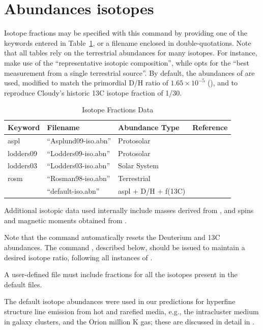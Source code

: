 \section{Abundances isotopes}

Isotope fractions may be specified with this command by providing
one of the keywords entered in Table~\ref{tab:isotopes}, or a
filename enclosed in double-quotations.
Note that all tables rely on the \citet{Rosman1998}
terrestrial abundances for many isotopes.
For instance, \citet{Asplund2009} make use of the
``representative isotopic composition'', while \citet{Lodders2003}
opts for the ``best measurement from a single terrestrial source''.
By default, the abundances of \citet{Asplund2009} are used,
modified to match the primordial D/H ratio of $1.65 \times 10^{-5}$
(\citealp{Pettini2001}), and to reproduce Cloudy's historic 13C isotope
fraction of 1/30.

\begin{table}
\centering
\caption{Isotope Fractions Data}
\label{tab:isotopes}
\begin{tabular}{llll}
\hline
Keyword		& Filename		& Abundance Type	&	Reference		\\
\hline
aspl		& ``Asplund09-iso.abn''	& Protosolar		&	\citet{Asplund2009}	\\
lodders09	& ``Lodders09-iso.abn''	& Protosolar		&	\citet{Lodders2009}	\\
lodders03	& ``Lodders03-iso.abn''	& Solar System		&	\citet{Lodders2003}	\\
rosm		& ``Rosman98-iso.abn''	& Terrestrial 		&	\citet{Rosman1998}	\\
    		& ``default-iso.abn''	& aspl + D/H + f(13C)	&				\\
\hline
\end{tabular}
\end{table}

Additional isotopic data used internally include masses
derived from \citet{Audi1995}, and spins and magnetic
moments obtained from \citet{Stone2005}.

Note that the command automatically resets the Deuterium
and 13C abundances.
The command , described
below, should be issued to maintain a desired isotope ratio,
following all instances of .

A user-defined file must include fractions for all
the isotopes present in the default files.

\par
The default isotope abundances were used in our predictions
for hyperfine structure line emission from hot and rarefied
media, e.g., the intracluster medium in galaxy clusters, and
the Orion million K gas; these are discussed in detail in
\citet{Chatzikos2014}.

